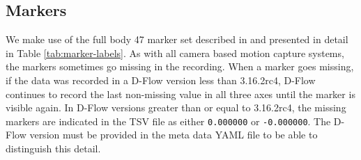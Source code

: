 \documentclass[fleqn,12pt]{wlpeerj}
\begin{document}
\subsection*{Markers}
%
We make use of the full body 47 marker set described in \cite{Bogert2013} and
presented in detail in Table \ref{tab:marker-labels}. As with all camera based
motion capture systems, the markers sometimes go missing in the recording. When
a marker goes missing, if the data was recorded in a D-Flow version less than
3.16.2rc4, D-Flow continues to record the last non-missing value in all
three axes until the marker is visible again. In D-Flow versions greater than
or equal to 3.16.2rc4, the missing markers are indicated in the TSV file as
either \verb|0.000000| or \verb|-0.000000|. The D-Flow version must be provided
in the meta data YAML file to be able to distinguish this detail.
%
\end{document}
